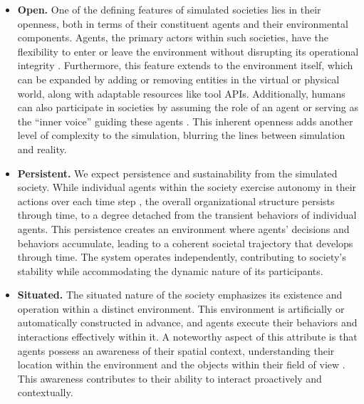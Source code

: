 \begin{itemize}[leftmargin=*]
    \item \textbf{Open.} One of the defining features of simulated societies lies in their openness, both in terms of their constituent agents and their environmental components. 
    Agents, the primary actors within such societies, have the flexibility to enter or leave the environment without disrupting its operational integrity \cite{DBLP:conf/cdc/HendrickxM17}. 
    Furthermore, this feature extends to the environment itself, which can be expanded by adding or removing entities in the virtual or physical world, along with adaptable resources like tool APIs. 
    Additionally, humans can also participate in societies by assuming the role of an agent or serving as the ``inner voice'' guiding these agents \cite{DBLP:journals/corr/abs-2304-03442}. 
    This inherent openness adds another level of complexity to the simulation, blurring the lines between simulation and reality.

    \item  \textbf{Persistent.} 
    We expect persistence and sustainability from the simulated society.
    While individual agents within the society exercise autonomy in their actions over each time step \cite{DBLP:journals/corr/abs-2304-03442, DBLP:journals/corr/abs-2307-14984}, the overall organizational structure persists through time, to a degree detached from the transient behaviors of individual agents. 
    This persistence creates an environment where agents’ decisions and behaviors accumulate, leading to a coherent societal trajectory that develops through time. 
    The system operates independently, contributing to society's stability while accommodating the dynamic nature of its participants.

    \item  \textbf{Situated.} The situated nature of the society emphasizes its existence and operation within a distinct environment. 
    This environment is artificially or automatically constructed in advance, and agents execute their behaviors and interactions effectively within it.
    A noteworthy aspect of this attribute is that agents possess an awareness of their spatial context, understanding their location within the environment and the objects within their field of view \cite{DBLP:journals/corr/abs-2304-03442, DBLP:journals/corr/abs-2305-16291}. 
    This awareness contributes to their ability to interact proactively and contextually.


\end{itemize}

